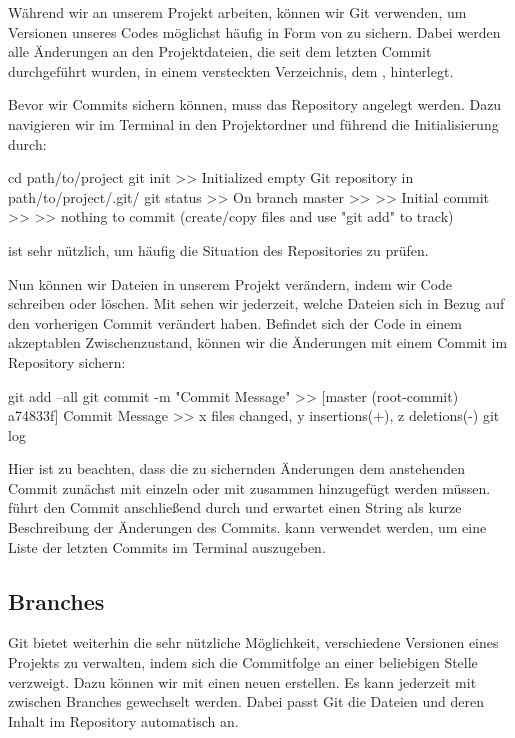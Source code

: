 \documentclass[parskip=half, final]{scrreprt}
\begin{document}
Während wir an unserem Projekt arbeiten, können wir Git verwenden, um Versionen unseres Codes möglichst häufig in Form von  zu sichern. Dabei werden alle Änderungen an den Projektdateien, die seit dem letzten Commit durchgeführt wurden, in einem versteckten  Verzeichnis, dem , hinterlegt.

Bevor wir Commits sichern können, muss das Repository angelegt werden. Dazu navigieren wir im Terminal in den Projektordner und führend die Initialisierung durch:

\begin{shlst}
cd path/to/project
git init
>> Initialized empty Git repository in path/to/project/.git/
git status
>> On branch master
>> 
>> Initial commit
>> 
>> nothing to commit (create/copy files and use "git add" to track)
\end{shlst}

 ist sehr nützlich, um häufig die Situation des Repositories zu prüfen.

Nun können wir Dateien in unserem Projekt verändern, indem wir Code schreiben oder löschen. Mit  sehen wir jederzeit, welche Dateien sich in Bezug auf den vorherigen Commit verändert haben. Befindet sich der Code in einem akzeptablen Zwischenzustand, können wir die Änderungen mit einem Commit im Repository sichern:

\begin{shlst}
git add --all
git commit -m "Commit Message"
>> [master (root-commit) a74833f] Commit Message
>>  x files changed, y insertions(+), z deletions(-)
git log
\end{shlst}

Hier ist zu beachten, dass die zu sichernden Änderungen dem anstehenden Commit zunächst mit  einzeln oder mit  zusammen hinzugefügt werden müssen.  führt den Commit anschließend durch und erwartet einen String als kurze Beschreibung der Änderungen des Commits.  kann verwendet werden, um eine Liste der letzten Commits im Terminal auszugeben.


\subsection{Branches}

Git bietet weiterhin die sehr nützliche Möglichkeit, verschiedene Versionen eines Projekts zu verwalten, indem sich die Commitfolge an einer beliebigen Stelle verzweigt. Dazu können wir mit  einen neuen  erstellen. Es kann jederzeit mit  zwischen Branches gewechselt werden. Dabei passt Git die Dateien und deren Inhalt im Repository automatisch an.
\end{document}
